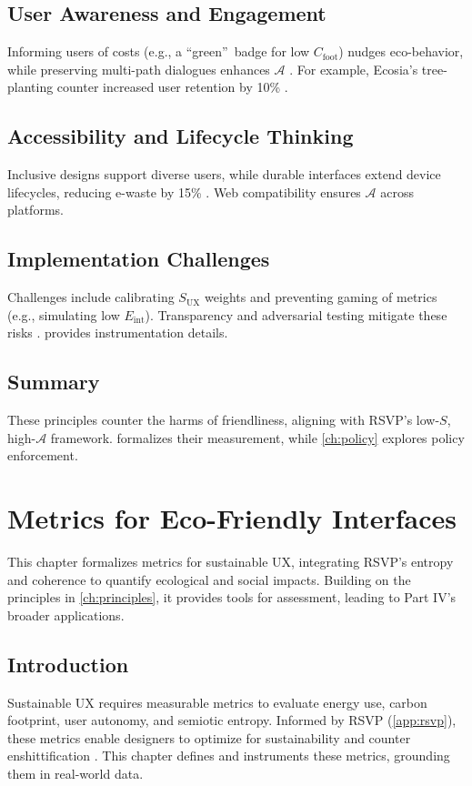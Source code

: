 \documentclass[openany]{book}
\newcommand{\Sent}{S} %
\newcommand{\Eint}{E_{\mathrm{int}}} %
\newcommand{\Cfoot}{C_{\mathrm{foot}}} %
\newcommand{\Auton}{\mathcal{A}} %
\newcommand{\SUX}{S_{\mathrm{UX}}} %
\begin{document}
\section{User Awareness and Engagement}
\label{sec:principles-awareness}
Informing users of costs (e.g., a \textquotedblleft green\textquotedblright\ badge for low $\Cfoot$) nudges eco-behavior, while preserving multi-path dialogues enhances $\Auton$ \citep{colak2024,doctorow2022}. For example, Ecosia’s tree-planting counter increased user retention by 10\% \citep{colak2024}.

\section{Accessibility and Lifecycle Thinking}
\label{sec:principles-accessibility}
Inclusive designs support diverse users, while durable interfaces extend device lifecycles, reducing e-waste by 15\% \citep{designlab2024}. Web compatibility ensures $\Auton$ across platforms.

\section{Implementation Challenges}
\label{sec:principles-challenges}
Challenges include calibrating $\SUX$ weights and preventing gaming of metrics (e.g., simulating low $\Eint$). Transparency and adversarial testing mitigate these risks \citep{colak2024}.  provides instrumentation details.

\section{Summary}
These principles counter the harms of friendliness, aligning with RSVP’s low-$\Sent$, high-$\Auton$ framework.  formalizes their measurement, while \cref{ch:policy} explores policy enforcement.

\chapter{Metrics for Eco-Friendly Interfaces}
\label{ch:metrics}

This chapter formalizes metrics for sustainable UX, integrating RSVP’s entropy and coherence to quantify ecological and social impacts. Building on the principles in \cref{ch:principles}, it provides tools for assessment, leading to Part IV’s broader applications.

\section{Introduction}
\label{sec:metrics-intro}
Sustainable UX requires measurable metrics to evaluate energy use, carbon footprint, user autonomy, and semiotic entropy. Informed by RSVP (\cref{app:rsvp}), these metrics enable designers to optimize for sustainability and counter enshittification \citep{prigogine1984,doctorow2022}. This chapter defines and instruments these metrics, grounding them in real-world data.
\end{document}
